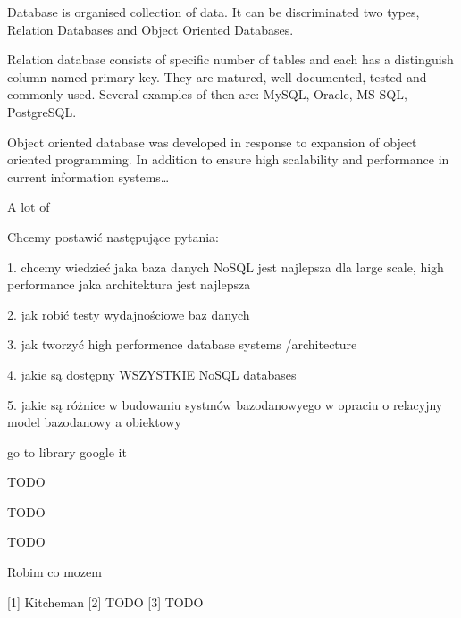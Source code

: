 \documentclass[times, 10pt,twocolumn]{article}
\begin{document}


Database is organised collection of data. It can be discriminated two types, 
Relation Databases and Object Oriented Databases.

Relation database consists of specific number of tables and each has a distinguish column named primary key. 
They are matured, well documented, tested and commonly used. Several examples of then are: MySQL, Oracle, MS SQL, PostgreSQL. 

Object oriented database was developed in response to expansion of object oriented programming. In addition to ensure high scalability and  
performance in current information systems\ldots

A lot of 


Chcemy postawić następujące pytania:

1. chcemy wiedzieć jaka baza danych NoSQL jest najlepsza dla large scale, high performance
jaka architektura jest najlepsza

2. jak robić testy wydajnościowe baz danych

3. jak tworzyć high performence database systems /architecture

4. jakie są dostępny WSZYSTKIE NoSQL databases

5. jakie są różnice w budowaniu systmów bazodanowyego w opraciu o relacyjny model bazodanowy a obiektowy



go to library
google it


TODO


TODO



TODO


Robim co mozem

[1] Kitcheman
[2] TODO
[3] TODO


\nocite{ex1,ex2}


\end{document}
